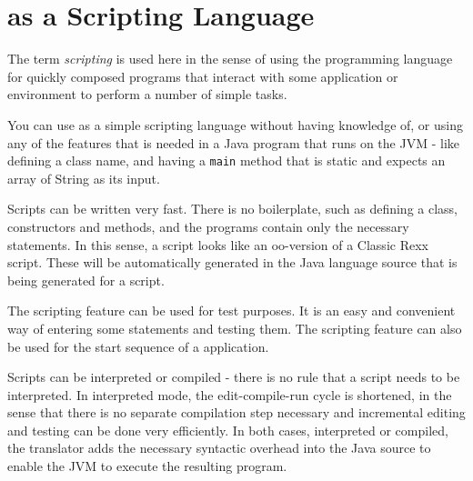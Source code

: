 \chapter{\nr{} as a Scripting Language}
The term \emph{scripting} is used here in the sense of using the
programming language for quickly composed programs that interact with
some application or environment to perform a number of simple tasks.

You can use \nr{} as a simple scripting language without having
knowledge of, or using any of the features that is needed in a Java
program that runs on the JVM - like defining a class name, and having
a \texttt{main} method that is static and expects an array of String
as its input. 

Scripts can be written very fast. There is
no boilerplate, such as defining a class, constructors and methods, and the programs contain only
the necessary statements. In this sense, a \nr{} script looks like
an oo-version of a Classic Rexx script.  These will be automatically generated
in the Java language source that is being generated for a script.

The scripting feature can be used for test purposes. It is an easy and convenient way of entering some statements and testing them.
The scripting feature can also be used for the start sequence of a \nr{} application.

Scripts can be interpreted or compiled - there is no rule that a
script needs to be interpreted. In interpreted mode, the
edit-compile-run cycle is shortened, in the sense that there is no separate compilation
step necessary and incremental editing and testing can be done very efficiently. In both cases, interpreted or
compiled, the \nr{} translator adds the necessary syntactic overhead
into the Java source to enable
the JVM to execute the resulting program.
